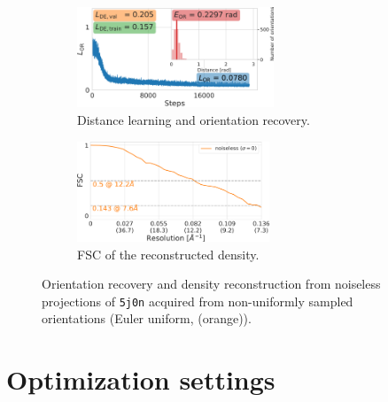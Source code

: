 \begin{figure}[ht!]
    \centering
    \begin{subfigure}[b]{0.48\linewidth}
        \centering
        \includegraphics[height=3cm]{figures/5j0n_ar_aa_fullcvg_smaller.pdf}
        \caption{Distance learning and orientation recovery.}%
        \label{fig:nonuniform:recovery}
    \end{subfigure}
    \hfill
    \begin{subfigure}[b]{0.48\linewidth}
        \centering
        \includegraphics[height=3cm]{figures/5j0n_fullcvg_noise0_FSC_apr_init_customFSC.pdf}
        \caption{FSC of the reconstructed density.}%
        \label{fig:nonuniform:reconstruction}
    \end{subfigure}
    \caption{%
        Orientation recovery and density reconstruction from noiseless projections of \texttt{5j0n} acquired from non-uniformly sampled orientations (Euler uniform,  (orange)).
    }
\end{figure}

\section{Optimization settings}\label{apx:optimization-settings}

